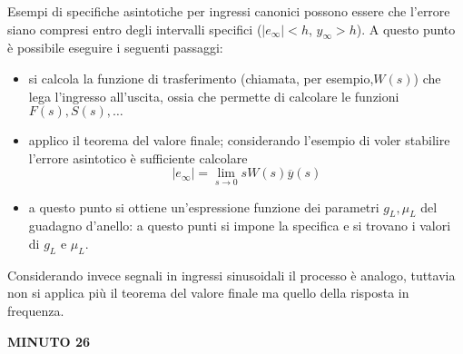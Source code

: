 		\vspace{3mm}
		
		Esempi di specifiche asintotiche per ingressi canonici possono essere che l'errore siano compresi entro degli intervalli specifici ($|e_\infty| <h$, $y_\infty > h$). A questo punto è possibile eseguire i seguenti passaggi:
		\begin{itemize}
			\item si calcola la funzione di trasferimento (chiamata, per esempio,$W(s)$) che lega l'ingresso all'uscita, ossia che permette di calcolare le funzioni $F(s), S(s), \dots$
			\item applico il teorema del valore finale; considerando l'esempio di voler stabilire l'errore asintotico è sufficiente calcolare
			\[ |e_\infty| = \lim_{s\rightarrow 0} s W(s) \overline y(s) \]
			\item a questo punto si ottiene un'espressione funzione dei parametri $g_L,\mu_L$ del guadagno d'anello: a questo punti si impone la specifica e si trovano i valori di $g_L$ e $\mu_L$.
		\end{itemize}
		
		\vspace{3mm}
		
		Considerando invece segnali in ingressi sinusoidali il processo è analogo, tuttavia non si applica più il teorema del valore finale ma quello della risposta in frequenza.
		
		\textbf{MINUTO 26}
				
		

































